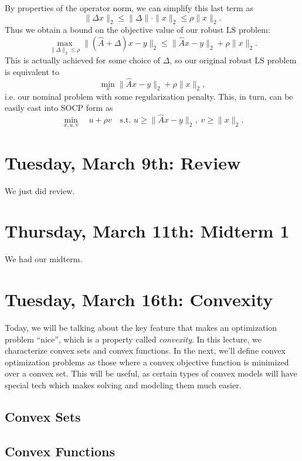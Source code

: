 \documentclass[11 pt]{scrartcl}
\begin{document}
By properties of the operator norm, we can simplify this last term as 
\[ \|\Delta x\|_2 \leq \|\Delta\| \cdot \|x\|_2 \leq \rho \|x\|_2.\] 
Thus we obtain a bound on the objective value of our robust LS problem: 
\[ \max_{\|\Delta \|_2 \leq \rho} \| (\hat{A} + \Delta)x - y \|_2 \leq \|\hat{A}x-y\|_2 + \rho \|x\|_2.\] 
This is actually achieved for some choice of $\Delta$, so our original robust LS problem is equivalent to  
\[ \min_x \|\hat{A} x - y\|_2 + \rho\|x\|_2,\] 
i.e. our nominal problem with some regularization penalty. 
This, in turn, can be easily cast into SOCP form as 
\[ \min_{x,u,v}\quad u + \rho v \quad \text{s.t. } u\geq \|\hat{A}x -y\|_2,\; v \geq \|x\|_2.\] 

\section{Tuesday, March 9th: Review}
We just did review. 

\section{Thursday, March 11th: Midterm 1}
We had our midterm. 

\newpage
\section{Tuesday, March 16th: Convexity}
Today, we will be talking about the key feature that makes an optimization problem ``nice'', which is a property called \emph{convexity}. 
In this lecture, we characterize convex sets and convex functions. 
In the next, we'll define convex optimization problems as those where a convex objective function is minimized over a convex set. 
This will be useful, as certain types of convex models will have special tech which makes solving and modeling them much easier. 

\subsection{Convex Sets}

\subsection{Convex Functions}
\end{document}
